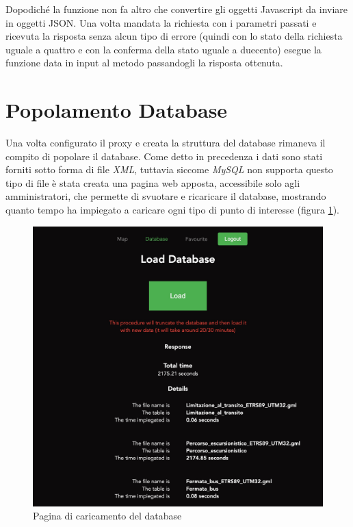Dopodiché la funzione non fa altro che convertire gli oggetti Javascript da inviare in oggetti JSON. Una volta mandata la richiesta con i parametri passati e ricevuta la risposta senza alcun tipo di errore (quindi con lo stato della richiesta uguale a quattro e con la conferma della stato uguale a duecento) esegue la funzione data in input al metodo passandogli la risposta ottenuta.


\section{Popolamento Database}

Una volta configurato il proxy e creata la struttura del database rimaneva il compito di popolare il database. Come detto in precedenza i dati sono stati forniti sotto forma di file \emph{XML}, tuttavia siccome \emph{MySQL} non supporta questo tipo di file è stata creata una pagina web apposta, accessibile solo agli amministratori, che permette di svuotare e ricaricare il database, mostrando quanto tempo ha impiegato a caricare ogni tipo di punto di interesse (figura \ref{fig:Caricamento_db}).

\begin{figure}[h]
\begin{center}                      
\includegraphics[width=13cm]{images/Caricamento_db.jpg}
\caption[Pagina di caricamento del database]{Pagina di caricamento del database}\label{fig:Caricamento_db}
\end{center}
\end{figure}

